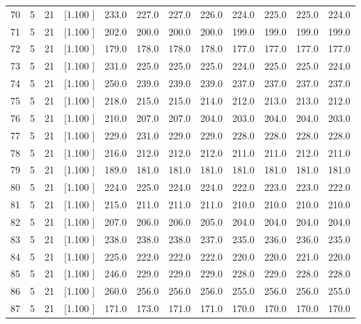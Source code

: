 \documentclass[12pt,a4paper]{article}
\begin{document}
\begin{center}
{\begin{tabular}{r r r r r r r r r r r r}
  70&  5& 21&[1.100     ]&   233.0&   227.0&   227.0&   226.0&   224.0&   225.0&   225.0&   224.0\\[-0.02in]
  71&  5& 21&[1.100     ]&   202.0&   200.0&   200.0&   200.0&   199.0&   199.0&   199.0&   199.0\\[-0.02in]
  72&  5& 21&[1.100     ]&   179.0&   178.0&   178.0&   178.0&   177.0&   177.0&   177.0&   177.0\\[-0.02in]
  73&  5& 21&[1.100     ]&   231.0&   225.0&   225.0&   225.0&   224.0&   225.0&   225.0&   224.0\\[-0.02in]
  74&  5& 21&[1.100     ]&   250.0&   239.0&   239.0&   239.0&   237.0&   237.0&   237.0&   237.0\\[-0.02in]
  75&  5& 21&[1.100     ]&   218.0&   215.0&   215.0&   214.0&   212.0&   213.0&   213.0&   212.0\\[-0.02in]
  76&  5& 21&[1.100     ]&   210.0&   207.0&   207.0&   204.0&   203.0&   204.0&   204.0&   203.0\\[-0.02in]
  77&  5& 21&[1.100     ]&   229.0&   231.0&   229.0&   229.0&   228.0&   228.0&   228.0&   228.0\\[-0.02in]
  78&  5& 21&[1.100     ]&   216.0&   212.0&   212.0&   212.0&   211.0&   211.0&   212.0&   211.0\\[-0.02in]
  79&  5& 21&[1.100     ]&   189.0&   181.0&   181.0&   181.0&   181.0&   181.0&   181.0&   181.0\\[-0.02in]
  80&  5& 21&[1.100     ]&   224.0&   225.0&   224.0&   224.0&   222.0&   223.0&   223.0&   222.0\\[-0.02in]
  81&  5& 21&[1.100     ]&   215.0&   211.0&   211.0&   211.0&   210.0&   210.0&   210.0&   210.0\\[-0.02in]
  82&  5& 21&[1.100     ]&   207.0&   206.0&   206.0&   205.0&   204.0&   204.0&   204.0&   204.0\\[-0.02in]
  83&  5& 21&[1.100     ]&   238.0&   238.0&   238.0&   237.0&   235.0&   236.0&   236.0&   235.0\\[-0.02in]
  84&  5& 21&[1.100     ]&   225.0&   222.0&   222.0&   222.0&   220.0&   220.0&   221.0&   220.0\\[-0.02in]
  85&  5& 21&[1.100     ]&   246.0&   229.0&   229.0&   229.0&   228.0&   229.0&   228.0&   228.0\\[-0.02in]
  86&  5& 21&[1.100     ]&   260.0&   256.0&   256.0&   256.0&   255.0&   256.0&   256.0&   255.0\\[-0.02in]
  87&  5& 21&[1.100     ]&   171.0&   173.0&   171.0&   171.0&   170.0&   170.0&   170.0&   170.0\\[-0.02in]

\end{tabular}}
\end{center}
\end{document}
